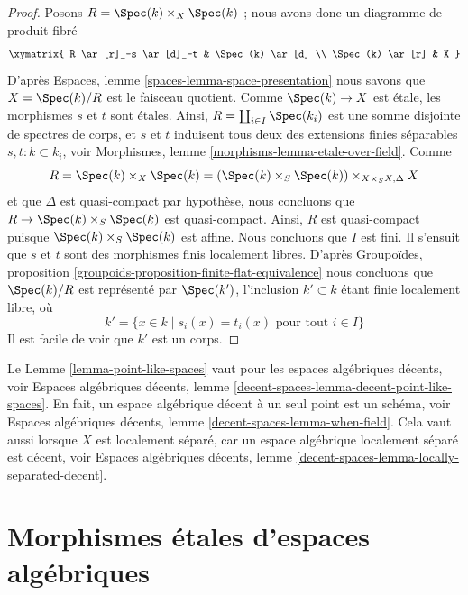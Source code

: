 \begin{proof}
Posons $R = \Spec(k) \times_X \Spec(k)$ ; nous avons donc un
diagramme de produit fibré
$$
\xymatrix{
R \ar[r]_-s \ar[d]_-t & \Spec(k) \ar[d] \\
\Spec(k) \ar[r] & X
}
$$
D'après
Espaces, lemme \ref{spaces-lemma-space-presentation}
nous savons que $X = \Spec(k)/R$ est le faisceau quotient.
Comme $\Spec(k) \to X$ est \'etale, les morphismes $s$ et $t$ sont
\'etales. Ainsi, $R = \coprod_{i \in I} \Spec(k_i)$ est une somme
disjointe de spectres de corps, et $s$ et $t$
induisent tous deux des extensions finies séparables $s, t : k \subset k_i$, voir
Morphismes, lemme \ref{morphisms-lemma-etale-over-field}.
Comme
$$
R = \Spec(k) \times_X \Spec(k)
= (\Spec(k) \times_S \Spec(k)) \times_{X \times_S X, \Delta} X
$$
et que $\Delta$ est quasi-compact par hypothèse, nous concluons que
$R \to \Spec(k) \times_S \Spec(k)$ est quasi-compact.
Ainsi, $R$ est quasi-compact puisque $\Spec(k) \times_S \Spec(k)$ est
affine. Nous concluons que $I$ est fini. Il s'ensuit
que $s$ et $t$ sont des morphismes finis localement libres. D'après
Groupoïdes, proposition \ref{groupoids-proposition-finite-flat-equivalence}
nous concluons que $\Spec(k)/R$ est
représenté par $\Spec(k')$, l'inclusion $k' \subset k$ étant finie localement libre,
où
$$
k' = \{x \in k \mid s_i(x) = t_i(x)\text{ pour tout }i \in I\}
$$
Il est facile de voir que $k'$ est un corps.
\end{proof}

\begin{remark}
\label{remark-cannot-decide-yet}
Le Lemme \ref{lemma-point-like-spaces} vaut pour les espaces algébriques décents, voir
Espaces algébriques décents, lemme \ref{decent-spaces-lemma-decent-point-like-spaces}.
En fait, un espace algébrique décent à un seul point est un schéma, voir
Espaces algébriques décents, lemme \ref{decent-spaces-lemma-when-field}.
Cela vaut aussi lorsque $X$ est localement séparé, car un
espace algébrique localement séparé est décent, voir
Espaces algébriques décents, lemme \ref{decent-spaces-lemma-locally-separated-decent}.
\end{remark}







\section{Morphismes \'etales d'espaces algébriques}
\label{section-etale-morphisms}

